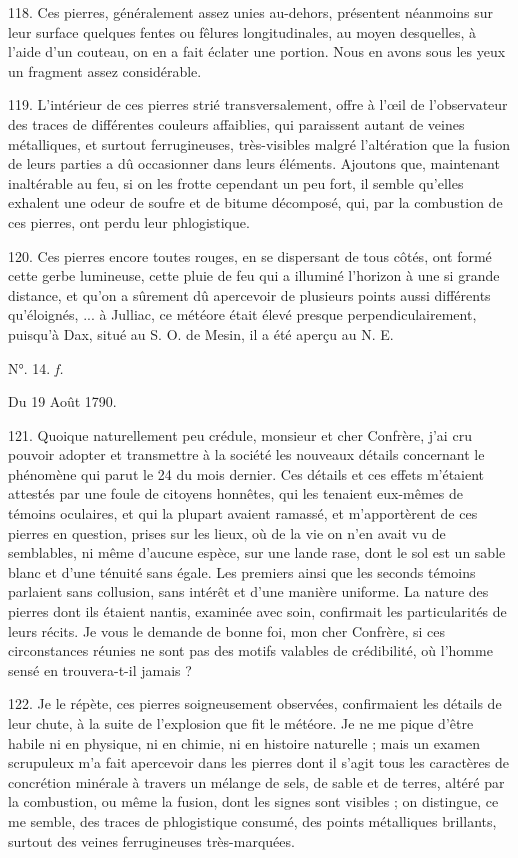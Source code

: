 \documentclass[a4paper, 11pt, oneside, polutonikogreek, french]{article}
\begin{document}
118. Ces pierres, généralement assez unies au-dehors, présentent néanmoins sur leur surface quelques fentes ou fêlures longitudinales, au moyen desquelles, à l'aide d'un couteau, on en a fait éclater une portion. Nous en avons sous les yeux un fragment assez considérable.

119. L'intérieur de ces pierres strié transversalement, offre à l'œil de l'observateur des traces de différentes couleurs affaiblies, qui paraissent autant de veines métalliques, et surtout ferrugineuses, très-visibles malgré l'altération que la fusion de leurs parties a dû occasionner dans leurs éléments. Ajoutons que, maintenant inaltérable au feu, si on les frotte cependant un peu fort, il semble qu'elles exhalent une odeur de soufre et de bitume décomposé, qui, par la combustion de ces pierres, ont perdu leur phlogistique.

120. Ces pierres encore toutes rouges, en se dispersant de tous côtés, ont formé cette gerbe lumineuse, cette pluie de feu qui a illuminé l'horizon à une si grande distance, et qu'on a sûrement dû apercevoir de plusieurs points aussi différents qu'éloignés, ... à Julliac, ce météore était élevé presque perpendiculairement, puisqu'à Dax, situé au S. O. de Mesin, il a été aperçu au N. E.

\begin{center}
N°. 14. \emph{f.}
\end{center}

Du 19 Août 1790.

121. Quoique naturellement peu crédule, monsieur et cher Confrère, j'ai cru pouvoir adopter et transmettre à la société les nouveaux détails concernant le phénomène qui parut le 24 du mois dernier. Ces détails et ces effets m'étaient attestés par une foule de citoyens honnêtes, qui les tenaient eux-mêmes de témoins oculaires, et qui la plupart avaient ramassé, et m'apportèrent de ces pierres en question, prises sur les lieux, où de la vie on n'en avait vu de semblables, ni même d'aucune espèce, sur une lande rase, dont le sol est un sable blanc et d'une ténuité sans égale. Les premiers ainsi que les seconds témoins parlaient sans collusion, sans intérêt et d'une manière uniforme. La nature des pierres dont ils étaient nantis, examinée avec soin, confirmait les particularités de leurs récits. Je vous le demande de bonne foi, mon cher Confrère, si ces circonstances réunies ne sont pas des motifs valables de crédibilité, où l'homme sensé en trouvera-t-il jamais ?

122. Je le répète, ces pierres soigneusement observées, confirmaient les détails de leur chute, à la suite de l'explosion que fit le météore. Je ne me pique d'être habile ni en physique, ni en chimie, ni en histoire naturelle ; mais un examen scrupuleux m'a fait apercevoir dans les pierres dont il s'agit tous les caractères de concrétion minérale à travers un mélange de sels, de sable et de terres, altéré par la combustion, ou même la fusion, dont les signes sont visibles ; on distingue, ce me semble, des traces de phlogistique consumé, des points métalliques brillants, surtout des veines ferrugineuses très-marquées.
\end{document}
